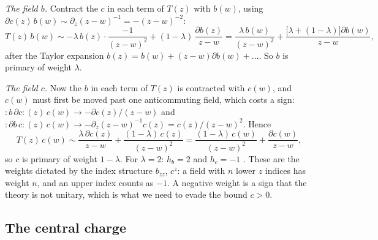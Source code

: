 \emph{The field $b$.} Contract the $c$ in each term of $T(z)$ with $b(w)$, using
$\partial c(z)\,b(w)\sim\partial_z(z-w)^{-1}=-(z-w)^{-2}$:
\[
  T(z)\,b(w)\sim-\lambda\,b(z)\cdot\frac{-1}{(z-w)^2}+(1-\lambda)\,\frac{\partial b(z)}{z-w}
  =\frac{\lambda\,b(w)}{(z-w)^2}+\frac{\bigl[\lambda+(1-\lambda)\bigr]\partial b(w)}{z-w},
\]
after the Taylor expansion $b(z)=b(w)+(z-w)\partial b(w)+\dots$. So $b$ is primary of weight
$\lambda$.

\emph{The field $c$.} Now the $b$ in each term of $T(z)$ is contracted with $c(w)$, and
$c(w)$ must first be moved past one anticommuting field, which costs a sign:
${:}b\,\partial c{:}(z)\,c(w)\to-\partial c(z)/(z-w)$ and
${:}\partial b\,c{:}(z)\,c(w)\to-\partial_z(z-w)^{-1}c(z)=c(z)/(z-w)^2$. Hence
\[
  T(z)\,c(w)\sim\frac{\lambda\,\partial c(z)}{z-w}+\frac{(1-\lambda)\,c(z)}{(z-w)^2}
  =\frac{(1-\lambda)\,c(w)}{(z-w)^2}+\frac{\partial c(w)}{z-w},
\]
so $c$ is primary of weight $1-\lambda$. For $\lambda=2$: $h_b=2$ and $h_c=-1$
. These are the weights dictated by the index structure
$b_{zz}$, $c^z$: a field with $n$ lower $z$ indices has weight $n$, and an upper index counts
as $-1$. A negative weight is a sign that the theory is not unitary, which is what we need to
evade the bound $c>0$.

\subsection{The central charge}

